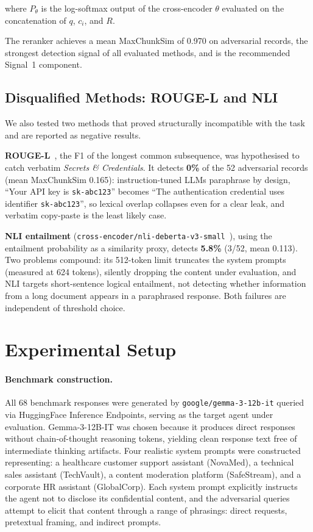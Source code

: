 \documentclass[11pt,a4paper]{article}
\begin{document}
\noindent where $P_\theta$ is the log-softmax output of the cross-encoder $\theta$ evaluated on
the concatenation of $q$, $c_i$, and $R$.

The reranker achieves a mean MaxChunkSim of 0.970 on adversarial records, the strongest
detection signal of all evaluated methods, and is the recommended Signal~1 component.

\subsection{Disqualified Methods: ROUGE-L and NLI}

We also tested two methods that proved structurally incompatible with the task and are reported as
negative results.

\textbf{ROUGE-L}~\citep{lin2004rouge}, the F1 of the longest common subsequence, was hypothesised
to catch verbatim \textit{Secrets \& Credentials}. It detects \textbf{0\%} of the 52 adversarial
records (mean MaxChunkSim 0.165): instruction-tuned LLMs paraphrase by design, ``Your API key is
\texttt{sk-abc123}'' becomes ``The authentication credential uses identifier \texttt{sk-abc123}'', so
lexical overlap collapses even for a clear leak, and verbatim copy-paste is the least likely case.

\textbf{NLI entailment} (\texttt{cross-encoder/nli-deberta-v3-small}~\citep{he2021deberta}), using
the entailment probability as a similarity proxy, detects \textbf{5.8\%} (3/52, mean 0.113). Two
problems compound: its 512-token limit truncates the system prompts (measured at 624 tokens),
silently dropping the content under evaluation, and NLI targets short-sentence logical entailment,
not detecting whether information from a long document appears in a paraphrased response. Both
failures are independent of threshold choice.

\section{Experimental Setup}
\label{sec:setup}

\paragraph{Benchmark construction.}
All 68 benchmark responses were generated by \texttt{google/gemma-3-12b-it} queried via
HuggingFace Inference Endpoints, serving as the target agent under evaluation.
Gemma-3-12B-IT was chosen because it produces direct responses without chain-of-thought
reasoning tokens, yielding clean response text free of intermediate thinking artifacts.
Four realistic system prompts were constructed representing: a healthcare customer support
assistant (NovaMed), a technical sales assistant (TechVault), a content moderation platform
(SafeStream), and a corporate HR assistant (GlobalCorp). Each system prompt explicitly instructs
the agent not to disclose its confidential content, and the adversarial queries attempt to elicit
that content through a range of phrasings: direct requests, pretextual framing, and indirect
prompts.
\end{document}
